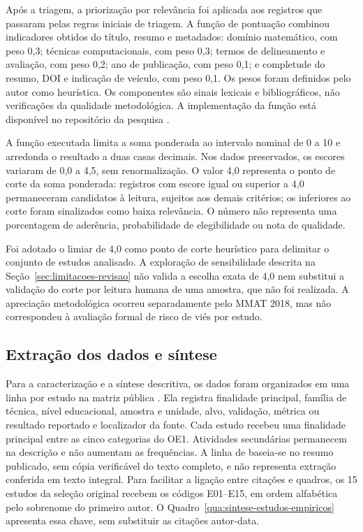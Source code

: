 Após a triagem, a priorização por relevância foi aplicada aos registros que passaram pelas regras iniciais de triagem. A função de pontuação combinou indicadores obtidos do título, resumo e metadados: domínio matemático, com peso 0,3; técnicas computacionais, com peso 0,3; termos de delineamento e avaliação, com peso 0,2; ano de publicação, com peso 0,1; e completude do resumo, DOI e indicação de veículo, com peso 0,1. Os pesos foram definidos pelo autor como heurística. Os componentes são sinais lexicais e bibliográficos, não verificações da qualidade metodológica. A implementação da função está disponível no repositório da pesquisa \cite{BatistaCCWCode2026}.

A função executada limita a soma ponderada ao intervalo nominal de 0 a 10 e arredonda o resultado a duas casas decimais. Nos dados preservados, os escores variaram de 0,0 a 4,5, sem renormalização. O valor 4,0 representa o ponto de corte da soma ponderada: registros com escore igual ou superior a 4,0 permaneceram candidatos à leitura, sujeitos aos demais critérios; os inferiores ao corte foram sinalizados como baixa relevância. O número não representa uma porcentagem de aderência, probabilidade de elegibilidade ou nota de qualidade.

Foi adotado o limiar de 4,0 como ponto de corte heurístico para delimitar o conjunto de estudos analisado. A exploração de sensibilidade descrita na Seção~\ref{sec:limitacoes-revisao} não valida a escolha exata de 4,0 nem substitui a validação do corte por leitura humana de uma amostra, que não foi realizada. A apreciação metodológica ocorreu separadamente pelo MMAT 2018, mas não correspondeu à avaliação formal de risco de viés por estudo.

\subsection{Extração dos dados e síntese}
\label{sec:extracao-sintese}

Para a caracterização e a síntese descritiva, os dados foram organizados em uma linha por estudo na matriz pública . Ela registra finalidade principal, família de técnica, nível educacional, amostra e unidade, alvo, validação, métrica ou resultado reportado e localizador da fonte. Cada estudo recebeu uma finalidade principal entre as cinco categorias do OE1. Atividades secundárias permanecem na descrição e não aumentam as frequências. A linha de  baseia-se no resumo publicado, sem cópia verificável do texto completo, e não representa extração conferida em texto integral. Para facilitar a ligação entre citações e quadros, os 15 estudos da seleção original recebem os códigos E01--E15, em ordem alfabética pelo sobrenome do primeiro autor. O Quadro~\ref{qua:sintese-estudos-empiricos} apresenta essa chave, sem substituir as citações autor-data.

